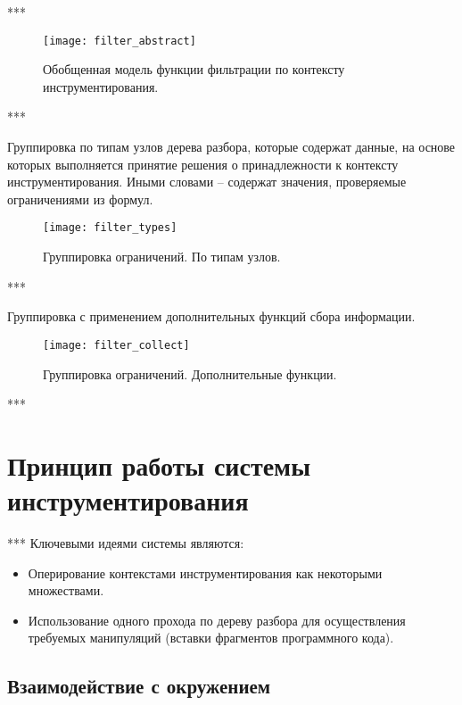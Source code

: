 ***

\begin{figure}[H]
	\centering
	\texttt{[image: filter\_abstract]}
	\caption{Обобщенная модель функции фильтрации по контексту инструментирования.}
	\label{fig:filter_abstract}
\end{figure}

***

Группировка по типам узлов дерева разбора, которые содержат данные, на основе которых выполняется принятие решения о принадлежности к контексту инструментирования. Иными словами -- содержат значения, проверяемые ограничениями из формул.

\begin{figure}[H]
	\centering
	\texttt{[image: filter\_types]}
	\caption{Группировка ограничений. По типам узлов.}
	\label{fig:filter_types}
\end{figure}

***

Группировка с применением дополнительных функций сбора информации.

\begin{figure}[H]
	\centering
	\texttt{[image: filter\_collect]}
	\caption{Группировка ограничений. Дополнительные функции.}
	\label{fig:filter_collect}
\end{figure}

***

\section{Принцип работы системы инструментирования}

***
Ключевыми идеями системы являются:
\begin{itemize}[noitemsep]
  \item Оперирование контекстами инструментирования как некоторыми множествами.
  \item Использование одного прохода по дереву разбора для осуществления требуемых манипуляций (вставки фрагментов программного кода).
\end{itemize}

\subsection{Взаимодействие с окружением}

